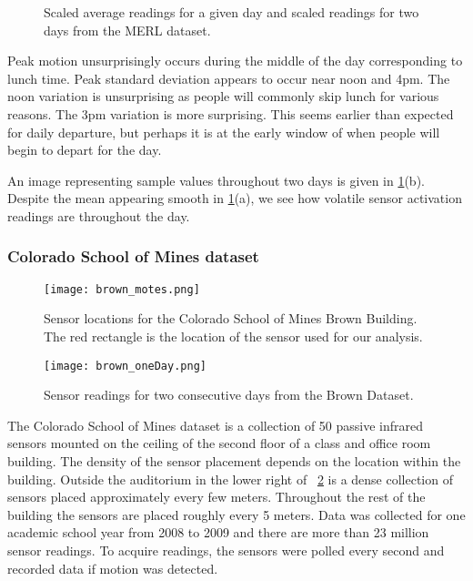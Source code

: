 \begin{figure}[!ht]
	\begin{center}
	\end{center}
	\caption{Scaled average readings for a given day and scaled readings for two days from the MERL dataset.}
	\label{fig:merl_scaled}
\end{figure}

Peak motion unsurprisingly occurs during the middle of the day corresponding to lunch time.  Peak standard deviation appears to occur near noon and 4pm.  The noon variation is unsurprising as people will commonly skip lunch for various reasons.  The 3pm variation is more surprising.  This seems earlier than expected for daily departure, but perhaps it is at the early window of when people will begin to depart for the day.  

An image representing sample values throughout two days is given in \ref{fig:merl_scaled}(b).  Despite the mean appearing smooth in \ref{fig:merl_scaled}(a), we see how volatile sensor activation readings are throughout the day.


\subsubsection{Colorado School of Mines dataset}

\begin{figure}[t!]
	\begin{center}
		\texttt{[image: brown\_motes.png]}
	\end{center}
	\caption{Sensor locations for the Colorado School of Mines Brown Building.  The red rectangle is the location of the sensor used for our analysis.}
	\label{fig:csmbbfloor}
\end{figure}

\begin{figure}[!h]
	\begin{center}
		\texttt{[image: brown\_oneDay.png]}
	\end{center}
	\caption{Sensor readings for two consecutive days from the Brown Dataset.}
	\label{fig:csmbbsensor}
\end{figure}

The Colorado School of Mines dataset \cite{Hoff2009, Howard2013} is a collection of 50 passive infrared sensors mounted on the ceiling of the second floor of a class and office room building.  The density of the sensor placement depends on the location within the building.  Outside the auditorium in the lower right of ~\ref{fig:csmbbfloor} is a dense collection of sensors placed approximately every few meters.  Throughout the rest of the building the sensors are placed roughly every 5 meters.  Data was collected for one academic school year from 2008 to 2009 and there are more than 23 million sensor readings.  To acquire readings, the sensors were polled every second and recorded data if motion was detected.  


